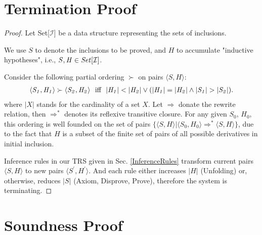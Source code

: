 \documentclass[acmsmall,10pt,review]{acmart}
\newcommand{\code}[1]{{\tt{\ensuremath{\m{#1}}}}}
\newcommand{\m}{\mathit}
\newcommand{\inclusion}{\code{\mathcal{I}}}
\newcommand\secref[1]{Sec. \textcolor{black}{\ref{#1}}}
\begin{document}
{{{



\appendix

\section{Termination Proof}  \label{proof:TerminationProof}

\begin{proof}\label{proof:termination} 
Let Set[\inclusion] be a data structure representing the sets of inclusions. 

We use \code{S} to denote the inclusions to be proved, and \code{H} to accumulate  "inductive hypotheses", i.e., \code{S,  H \in Set[\inclusion]}.

Consider the following partial ordering \code{\succ} on pairs \code{\langle S, H \rangle}:
\begin{gather*}
\code{\langle S_1, H_1 \rangle \succ \langle S_2, H_2 \rangle}\ \ \text{iff}\ \ \code{|H_1| < |H_2| \vee 
(|H_1| = |H_2| \wedge |S_1| > |S_2|)}. 
\end{gather*}
where \code{|X|} stands for the cardinality of a set \code{X}.  Let \code{\Rightarrow} donate the rewrite relation, then \code{\Rightarrow^*} denotes its reflexive transitive closure. For any given \code{S_0}, \code{H_0}, this ordering is well founded on the set of pairs \code{\{\langle S, H \rangle | \langle S_0, H_0 \rangle \Rightarrow^* \langle S, H \rangle \}}, due to the fact that \code{H} is a subset of the finite set of pairs of all possible derivatives in initial inclusion.


Inference rules in our TRS given in \secref{InferenceRules} transform current pairs \code{\langle S, H \rangle} to new pairs \code{\langle S^\prime, H^\prime \rangle}. 
And each rule either increases \code{|H|} (Unfolding) or, otherwise, reduces \code{|S|} (Axiom, Disprove, Prove), therefore the system is terminating.




 \end{proof}


\section{Soundness Proof} 
 \label{proof:SoundnessProof}
 

}}}
\end{document}
